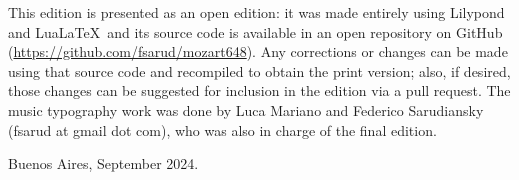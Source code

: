 This edition is presented as an open edition: it was made entirely using Lilypond and Lua\LaTeX\ and its source code is available in an open repository on GitHub (\href{https://github.com/fsarud/mozart648}{https://github.com/fsarud/mozart648}). Any corrections or changes can be made using that source code and recompiled to obtain the print version; also, if desired, those changes can be suggested for inclusion in the edition via a pull request. The music typography work was done by Luca Mariano and Federico Sarudiansky (fsarud at gmail dot com), who was also in charge of the final edition. 

Buenos Aires, September 2024.
